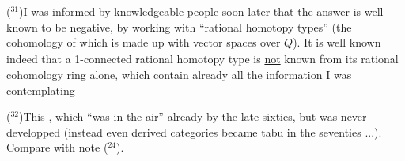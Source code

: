 ($^{31}$)\quad I was informed by knowledgeable people soon later that the answer is
well known to be negative,  by working with ``rational homotopy types''
(the cohomology of which is made up with vector spaces over $\underline{Q}$). It is well
known indeed that a 1-connected rational homotopy type is \uline{not} known from
its rational cohomology ring alone,  which  contain already all the information I was contemplating

($^{32}$)\quad This  , which
``was in the air'' already by the late sixties,  but was never developped 
(instead even derived categories became tabu in the seventies ...). Compare
with note ($^{24}$).

